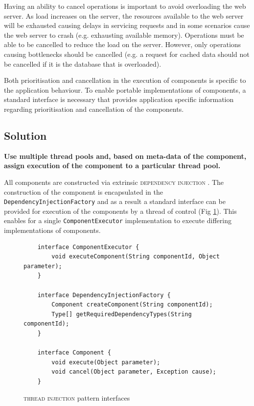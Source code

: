 \documentclass[prodmode]{style/acmlarge}
\begin{document}
Having an ability to cancel operations is important to avoid overloading the web
server.  As load increases on the server, the resources available to the web
server will be exhausted causing delays in servicing requests and in some
scenarios cause the web server to crash (e.g. exhausting available memory). 
Operations must be able to be cancelled to reduce the load on the server. 
However, only operations causing bottlenecks should be cancelled (e.g. a request
for cached data should not be cancelled if it is the database that is
overloaded).

Both prioritisation and cancellation in the execution of components is specific
to the application behaviour.  To enable portable implementations of components,
a standard interface is necessary that provides application specific information
regarding prioritisation and cancellation of the components.


\subsection{Solution}

\textbf{Use multiple thread pools and, based on meta-data of the component, assign execution of the component to a particular thread pool.}

All components are constructed via extrinsic \textsc{dependency injection}
\cite{ioc}.  The construction of the component is encapsulated in the
\texttt{DependencyInjectionFactory} and as a result a standard interface can be
provided for execution of the components by a thread of control (Fig
\ref{fig:ThreadInjectionInterfaces}).  This enables for a single
\texttt{ComponentExecutor} implementation to execute differing implementations
of components.

\begin{figure}[tp]
\centering
\begin{verbatim}
    interface ComponentExecutor {
        void executeComponent(String componentId, Object parameter);
    }

    interface DependencyInjectionFactory {
        Component createComponent(String componentId);
        Type[] getRequiredDependencyTypes(String componentId);
    }

    interface Component {
        void execute(Object parameter); 
        void cancel(Object parameter, Exception cause);
    }
\end{verbatim}
\caption{\textsc{thread injection} pattern interfaces\footnotemark}
\label{fig:ThreadInjectionInterfaces}
\end{figure}
\end{document}
